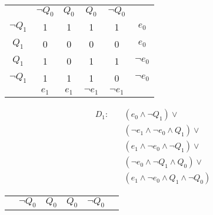 \documentclass[a4paper, 12pt, margins=2cm]{homework}
\begin{document}
\begin{solution}
\begin{enumerate}[label=(\alph*)]
    \begin{minipage}{0.5\textwidth}
      \begin{center}
        \begin{tabular}{cccccc}
                                          & $\neg Q_0$             & $Q_0$                  & $Q_0$                  & $\neg Q_0$             &            \\ \cline{2-5}
          \multicolumn{1}{c|}{$\neg Q_1$} & \multicolumn{1}{c|}{1} & \multicolumn{1}{c|}{1} & \multicolumn{1}{c|}{1} & \multicolumn{1}{c|}{1} & $e_0$      \\ \cline{2-5}
          \multicolumn{1}{c|}{$Q_1$}      & \multicolumn{1}{c|}{0} & \multicolumn{1}{c|}{0} & \multicolumn{1}{c|}{0} & \multicolumn{1}{c|}{0} & $e_0$      \\ \cline{2-5}
          \multicolumn{1}{c|}{$Q_1$}      & \multicolumn{1}{c|}{1} & \multicolumn{1}{c|}{0} & \multicolumn{1}{c|}{1} & \multicolumn{1}{c|}{1} & $\neg e_0$ \\ \cline{2-5}
          \multicolumn{1}{c|}{$\neg Q_1$} & \multicolumn{1}{c|}{1} & \multicolumn{1}{c|}{1} & \multicolumn{1}{c|}{1} & \multicolumn{1}{c|}{0} & $\neg e_0$ \\ \cline{2-5}
                                          & $e_1$                  & $e_1$                  & $\neg e_1$             & $\neg e_1$             &           
        \end{tabular}
        \begin{align*}
          D_1:\quad & (e_0 \wedge \neg Q_1) \vee \\
                    & (\neg e_1 \wedge \neg e_0 \wedge Q_1) \vee \\
                    & (e_1 \wedge \neg e_0 \wedge \neg Q_1) \vee \\
                    & (\neg e_0 \wedge \neg Q_1 \wedge Q_0) \vee \\
                    & (e_1 \wedge \neg e_0 \wedge Q_1 \wedge \neg Q_0)
        \end{align*}
      \end{center}
    \end{minipage}
    \begin{minipage}{0.5\textwidth}
      \begin{center}
        \begin{tabular}{cccccc}
                                          & $\neg Q_0$             & $Q_0$                  & $Q_0$                  & $\neg Q_0$             &            \\ \cline{2-5}

\end{tabular}
\end{center}
\end{minipage}
\end{enumerate}
\end{solution}
\end{document}
